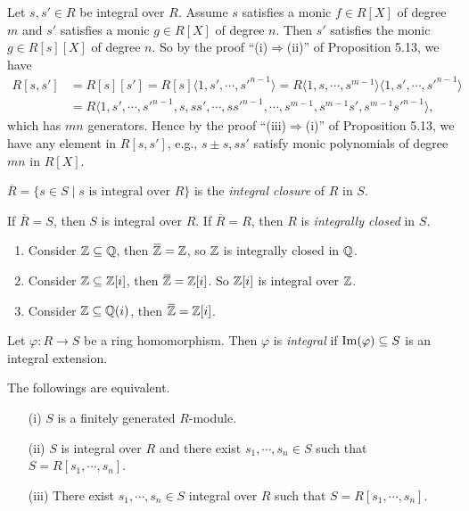 \begin{note*}
    Let $s,s' \in R$ be integral over $R$. Assume $s$ satisfies a monic $f \in R[X]$ of degree $m$ and $s'$ satisfies a monic $g \in R[X]$ of degree $n$. Then $s'$ satisfies the monic $g \in R[s][X]$ of degree $n$. So by the proof ``(i)$\Rightarrow$(ii)'' of Proposition 5.13, we have
    \begin{align*}
        R[s,s'] &= R[s][s'] = R[s]\langle 1,s',\cdots,s'^{n-1} \rangle = R\langle 1,s,\cdots,s^{m-1} \rangle \langle 1,s',\cdots,s'^{n-1} \rangle \\
        &= R\langle 1,s',\cdots,s'^{n-1},s,ss',\cdots,ss'^{n-1},\cdots,s^{m-1},s^{m-1}s',s^{m-1}s'^{n-1} \rangle,
    \end{align*}
    which has $mn$ generators. Hence by the proof ``(iii)$\Rightarrow$(i)'' of Proposition 5.13, we have any element in $R[s,s']$, e.g., $s \pm s,ss'$ satisfy monic polynomials of degree $mn$ in $R[X]$.
\end{note*}

\begin{definition}
    $\overbar{R} = \{s \in S \mid s \text{ is integral over }R\}$ is the \emph{integral closure} of $R$ in $S$. \par 
    If $\overbar{R} = S$, then $S$ is integral over $R$. If $\overbar{R} = R$, then $R$ is \emph{integrally closed} in $S$.
\end{definition}

\begin{example}
    \begin{enumerate}
        \item Consider $\mathbb{Z} \subseteq \mathbb{Q}$, then $\overbar{\bbZ} = \bbZ$, so $\mathbb{Z}$ is integrally closed in $\mathbb{Q}$.
        \item Consider $\mathbb{Z} \subseteq \mathbb{Z}[i]$, then $\overbar{\bbZ} = \bbZ[i]$. So $\mathbb{Z}[i]$ is integral over $\mathbb{Z}$.
        \item Consider $\mathbb{Z} \subseteq \mathbb{Q}(i)$, then $\overbar{\bbZ} = \bbZ[i]$.
    \end{enumerate}
\end{example}

\begin{definition}
    Let $\varphi: R \to S$ be a ring homomorphism. Then $\varphi$ is \emph{integral} if $\operatorname{Im}(\varphi) \subseteq S$ is an integral extension.
\end{definition}

\begin{theorem}
    The followings are equivalent.
    \begin{enumerate}
        \item[(i)]
            $S$ is a finitely generated $R$-module.
        \item[(ii)]
            $S$ is integral over $R$ and there exist $s_1,\cdots,s_n \in S$ such that $S = R[s_1,\cdots,s_n]$.
        \item[(iii)] There exist $s_1,\cdots,s_n \in S$ integral over $R$ such that $S = R[s_1,\cdots,s_n]$.
    \end{enumerate}
\end{theorem}

